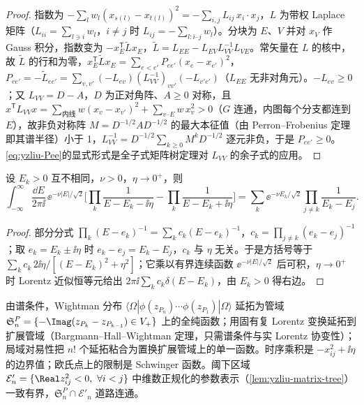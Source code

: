 \begin{proof}
指数为 $-\sum_lw_l(x_{s(l)}-x_{t(l)})^2=-\sum_{i,j}L_{ij}\,x_i\cdot x_j$，$L$ 为带权 Laplace 矩阵（$L_{ii}=\sum_{l\ni i}w_l$，$i\ne j$ 时 $L_{ij}=-\sum_{l:i\text{–}j}w_l$）。分块为 $E$、$V$ 并对 $x_V$ 作 Gauss 积分，指数变为 $-x_E^{\mathsf T}\tilde Lx_E$，$\tilde L=L_{EE}-L_{EV}L_{VV}^{-1}L_{VE}$。常矢量在 $L$ 的核中，故 $\tilde L$ 的行和为零，$x_E^{\mathsf T}\tilde Lx_E=\sum_{e<e'}P_{ee'}(x_e-x_{e'})^2$，$P_{ee'}=-\tilde L_{ee'}=\sum_{v,v'}(-L_{ev})(L_{VV}^{-1})_{vv'}(-L_{v'e'})$（$L_{EE}$ 无非对角元）。$-L_{ev}\ge0$；又 $L_{VV}=D-A$，$D$ 为正对角阵、$A\ge0$ 对称，且 $x^{\mathsf T}L_{VV}x=\sum_{\text{内线}}w(x_v-x_{v'})^2+\sum_{v\text{–}E}w\,x_v^2>0$（$G$ 连通，内图每个分支都连到 $E$），故非负对称阵 $M=D^{-1/2}AD^{-1/2}$ 的最大本征值（由 Perron--Frobenius 定理即其谱半径）小于 1，$L_{VV}^{-1}=D^{-1/2}\sum_{k\ge0}M^kD^{-1/2}$ 逐元非负，于是 $P_{ee'}\ge0$。\cref{eq:yzliu-Pee}的显式形式是全子式矩阵树定理\cite{Bogner:2010kv}对 $L_{VV}$ 的余子式的应用。
\end{proof}

\begin{lemma}[末态求和恒等式]\label{lem:yzliu-final-state}
设 $E_k>0$ 互不相同，$\nu>0$，$\eta\to0^+$，则 %
\begin{equation}\label{eq:yzliu-final-state}
\int_{-\infty}^{\infty}\frac{\dd E}{2\pi\ii}\,\ee^{-\nu|E|/\sqrt2}\Big[\prod_k\frac{1}{E-E_k-\ii\eta}-\prod_k\frac{1}{E-E_k+\ii\eta}\Big]=\sum_k\ee^{-\nu E_k/\sqrt2}\prod_{j\ne k}\frac{1}{E_k-E_j} .
\end{equation}
\end{lemma}

\begin{proof}
部分分式 $\prod_k(E-e_k)^{-1}=\sum_kc_k(E-e_k)^{-1}$，$c_k=\prod_{j\ne k}(e_k-e_j)^{-1}$；取 $e_k=E_k\pm\ii\eta$ 时 $e_k-e_j=E_k-E_j$，$c_k$ 与 $\eta$ 无关。于是方括号等于 $\sum_kc_k\,2\ii\eta/[(E-E_k)^2+\eta^2]$；它乘以有界连续函数 $\ee^{-\nu|E|/\sqrt2}$ 后可积，$\eta\to0^+$ 时 Lorentz 近似恒等元给出 $2\pi\ii\sum_kc_k\delta(E-E_k)$，由 $E_k>0$ 得右边。
\end{proof}

\begin{tcolorbox}[enhanced,breakable,colback=gray!3!white,colframe=gray!45!black,boxrule=0.5pt,arc=2pt,left=4pt,right=4pt,top=2pt,bottom=2pt,title={Wightman 预备知识},fonttitle=\bfseries\small]
\small
由谱条件，Wightman 分布 $\langle\Omega|\phi(z_{P_n})\cdots\phi(z_{P_1})|\Omega\rangle$ 延拓为管域 $\mathfrak S^P_n=\{-\Imag(z_{P_k}-z_{P_{k-1}})\in V_+\}$ 上的全纯函数；用固有复 Lorentz 变换延拓到扩展管域（Bargmann--Hall--Wightman 定理，只需谱条件与实 Lorentz 协变性\cite[定理~2-11]{Streater:1989vi}）；局域对易性把 $n!$ 个延拓粘合为置换扩展管域上的单一函数。时序乘积是 $-x_{ij}^2+\ii\eta$ 的边界值；欧氏点上的限制是 Schwinger 函数。阈下区域 $\mathcal E'_n=\{\Real z_{ij}^2<0,\ \forall i<j\}$ 中维数正规化的参数表示（\cref{lem:yzliu-matrix-tree}）一致有界，$\mathfrak S^P_n\cap\mathcal E'_n$ 道路连通\cite[第~2~节、附录~B]{Liu:2023pjb}。
\end{tcolorbox}

